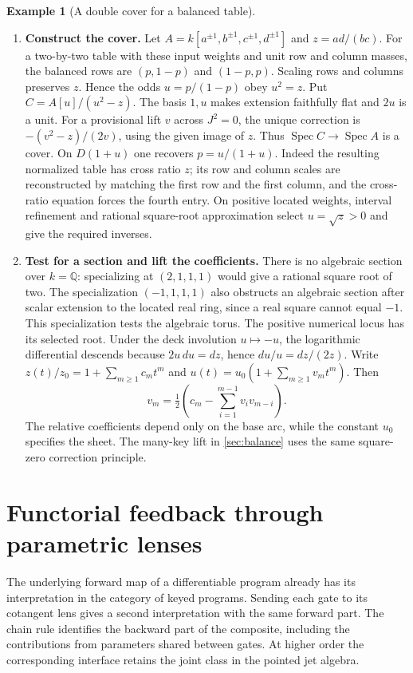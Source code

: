 \documentclass[11pt,a4paper]{article}
\theoremstyle{definition}
\newtheorem{example}[example]{Example}
\theoremstyle{remark}\newaliascnt{remark}{theorem}
\newcommand{\Q}{\mathbb Q}
\newcommand{\Spec}{\operatorname{Spec}}
\numberwithin{equation}{section}
\begin{document}
\begin{example}[A double cover for a balanced table]\label{ex:root-cover}\leavevmode
\begin{enumerate}[titledsteps]
    \item \textbf{Construct the cover.} Let $A=k[a^{\pm1},b^{\pm1},c^{\pm1},d^{\pm1}]$ and $z=ad/(bc)$. For a two-by-two table with these input weights and unit row and column masses, the balanced rows are $(p,1-p)$ and $(1-p,p)$. Scaling rows and columns preserves $z$. Hence the odds $u=p/(1-p)$ obey $u^2=z$. Put $C=A[u]/(u^2-z)$. The basis $1,u$ makes extension faithfully flat and $2u$ is a unit. For a provisional lift $v$ across $J^2=0$, the unique correction is $-(v^2-z)/(2v)$, using the given image of $z$. Thus $\Spec C\to\Spec A$ is a cover. On $D(1+u)$ one recovers $p=u/(1+u)$. Indeed the resulting normalized table has cross ratio $z$; its row and column scales are reconstructed by matching the first row and the first column, and the cross-ratio equation forces the fourth entry. On positive located weights, interval refinement and rational square-root approximation select $u=\sqrt z>0$ and give the required inverses.
  

    \item \textbf{Test for a section and lift the coefficients.} There is no algebraic section over \(k=\Q\): specializing at \((2,1,1,1)\) would give a rational square root of two. The specialization \((-1,1,1,1)\) also obstructs an algebraic section after scalar extension to the located real ring, since a real square cannot equal \(-1\). This specialization tests the algebraic torus. The positive numerical locus has its selected root. Under the deck involution \(u\mapsto-u\), the logarithmic differential descends because \(2u\,du=dz\), hence \(du/u=dz/(2z)\). Write \(z(t)/z_0=1+\sum_{m\ge1}c_mt^m\) and \(u(t)=u_0(1+\sum_{m\ge1}v_mt^m)\). Then
\[
 v_m=\tfrac12\!\left(c_m-\sum_{i=1}^{m-1}v_i v_{m-i}\right).
\]
The relative coefficients depend only on the base arc, while the constant \(u_0\) specifies the sheet. The many-key lift in \cref{sec:balance} uses the same square-zero correction principle.
\end{enumerate}
\end{example}

\section{Functorial feedback through parametric lenses}\label{sec:optic-feedback}
The underlying forward map of a differentiable program already has its interpretation in the category of keyed programs. Sending each gate to its cotangent lens gives a second interpretation with the same forward part. The chain rule identifies the backward part of the composite, including the contributions from parameters shared between gates. At higher order the corresponding interface retains the joint class in the pointed jet algebra.
\end{document}
